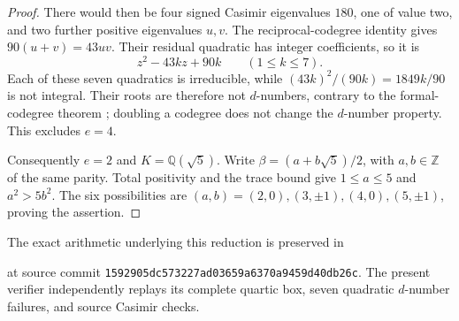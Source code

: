 \begin{proof}
There would then be four signed Casimir eigenvalues $180$, one
of value two, and two further positive eigenvalues $u,v$.
The reciprocal-codegree identity gives
$90(u+v)=43uv$. Their residual quadratic has integer coefficients,
so it is
\[
 z^2-43kz+90k\qquad(1\leq k\leq7).
\]
Each of these seven quadratics is irreducible, while
$(43k)^2/(90k)=1849k/90$ is not integral. Their roots are therefore
not $d$-numbers, contrary to the formal-codegree theorem
\cite{OstrikCodegrees}; doubling a codegree does not change the
$d$-number property. This excludes $e=4$.

Consequently $e=2$ and $K=\mathbb Q(\sqrt5)$. Write
$\beta=(a+b\sqrt5)/2$, with $a,b\in\mathbb Z$ of the same parity.
Total positivity and the trace bound give
$1\leq a\leq5$ and $a^2>5b^2$. The six possibilities are
$(a,b)=(2,0),(3,\pm1),(4,0),(5,\pm1)$, proving the assertion.
\end{proof}

The exact arithmetic underlying this reduction is preserved in
\begin{quote}\small
{}
\end{quote}
at source commit \texttt{1592905dc573227ad03659a6370a9459d40db26c}.
The present verifier independently replays its complete quartic box,
seven quadratic $d$-number failures, and source Casimir checks.
